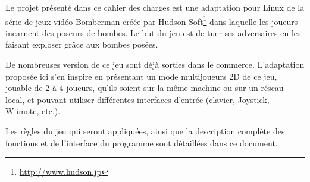 Le projet présenté dans ce cahier des charges est une adaptation pour Linux de la série de jeux vidéo Bomberman créée par Hudson Soft\footnote{\url{http://www.hudson.jp}} dans laquelle les joueurs incarnent des poseurs de bombes. Le but du jeu est de tuer ses adversaires en les faisant exploser grâce aux bombes posées.

\vspace{0.5cm}

De nombreuses version de ce jeu sont déjà sorties dans le commerce. L'adaptation proposée ici s'en inspire en présentant un mode multijoueurs 2D de ce jeu, jouable de 2 à 4 joueurs, qu'ils soient sur la même machine ou sur un réseau local, et pouvant utiliser différentes interfaces d'entrée (clavier, Joystick, Wiimote, etc.).

\vspace{0.5cm}

Les règles du jeu qui seront appliquées, ainsi que la description complète des fonctions et de l'interface du programme sont détaillées dans ce document.